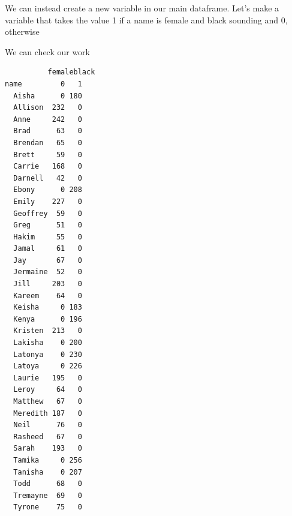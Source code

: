 \documentclass[
  letterpaper,
  DIV=11,
  numbers=noendperiod]{scrreprt}
\newenvironment{Shaded}{\begin{snugshade}}{\end{snugshade}}
\newcommand{\AttributeTok}[1]{\textcolor[rgb]{0.40,0.45,0.13}{#1}}
\newcommand{\CommentTok}[1]{\textcolor[rgb]{0.37,0.37,0.37}{#1}}
\newcommand{\ConstantTok}[1]{\textcolor[rgb]{0.56,0.35,0.01}{#1}}
\newcommand{\DecValTok}[1]{\textcolor[rgb]{0.68,0.00,0.00}{#1}}
\newcommand{\FunctionTok}[1]{\textcolor[rgb]{0.28,0.35,0.67}{#1}}
\newcommand{\NormalTok}[1]{\textcolor[rgb]{0.00,0.23,0.31}{#1}}
\newcommand{\OtherTok}[1]{\textcolor[rgb]{0.00,0.23,0.31}{#1}}
\newcommand{\SpecialCharTok}[1]{\textcolor[rgb]{0.37,0.37,0.37}{#1}}
\newcommand{\StringTok}[1]{\textcolor[rgb]{0.13,0.47,0.30}{#1}}
\begin{document}
We can instead create a new variable in our main dataframe. Let's make a
variable that takes the value 1 if a name is female and black sounding
and 0, otherwise

\begin{Shaded}
\end{Shaded}

We can check our work

\begin{Shaded}
\end{Shaded}

\begin{verbatim}
          femaleblack
name         0   1
  Aisha      0 180
  Allison  232   0
  Anne     242   0
  Brad      63   0
  Brendan   65   0
  Brett     59   0
  Carrie   168   0
  Darnell   42   0
  Ebony      0 208
  Emily    227   0
  Geoffrey  59   0
  Greg      51   0
  Hakim     55   0
  Jamal     61   0
  Jay       67   0
  Jermaine  52   0
  Jill     203   0
  Kareem    64   0
  Keisha     0 183
  Kenya      0 196
  Kristen  213   0
  Lakisha    0 200
  Latonya    0 230
  Latoya     0 226
  Laurie   195   0
  Leroy     64   0
  Matthew   67   0
  Meredith 187   0
  Neil      76   0
  Rasheed   67   0
  Sarah    193   0
  Tamika     0 256
  Tanisha    0 207
  Todd      68   0
  Tremayne  69   0
  Tyrone    75   0
\end{verbatim}
\end{document}
